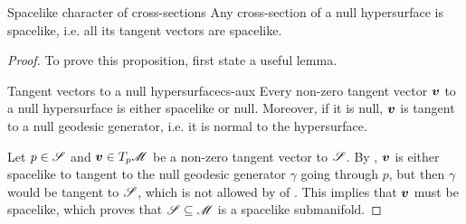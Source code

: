 \begin{proposition}{Spacelike character of cross-sections}{}
  Any cross-section of a null hypersurface is spacelike, i.e. all its tangent vectors are spacelike.
\end{proposition}

\begin{proofbox}
  \begin{proof}
    To prove this proposition, first state a useful lemma.

    \begin{lemma}{Tangent vectors to a null hypersurface}{cs-aux}
      Every non-zero tangent vector $ \boldsymbol{v} $ to a null hypersurface is either spacelike or null. Moreover, if it is null, $ \boldsymbol{v} $ is tangent to a null geodesic generator, i.e. it is normal to the hypersurface.
    \end{lemma}

    Let $ p \in \mathscr{S} $ and $ \boldsymbol{v} \in T_p\mathscr{M} $ be a non-zero tangent vector to $ \mathscr{S} $. By , $ \boldsymbol{v} $ is either spacelike to tangent to the null geodesic generator $ \gamma $ going through $ p $, but then $ \gamma $ would be tangent to $ \mathscr{S} $, which is not allowed by  of . This implies that $ \boldsymbol{v} $ must be spacelike, which proves that $ \mathscr{S} \subseteq \mathscr{M} $ is a spacelike submanifold.
  \end{proof}
\end{proofbox}

